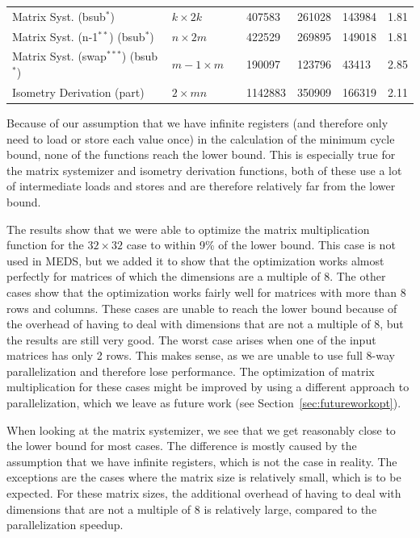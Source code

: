 \documentclass[11pt,a4paper]{report}
\theoremstyle{definition}
\begin{document}
\begin{table}
{\begin{tabular}{lllR{1.35cm}R{1.2cm}R{1.2cm}r}
      Matrix Syst. (bsub$^{*}$) & $k \times 2k$& & 407583 & 261028 & 143984 & 1.81\\
      Matrix Syst. (n-1$^{**}$) (bsub$^{*}$) & $n \times 2m$& & 422529 & 269895 & 149018 & 1.81\\
      Matrix Syst. (swap$^{***}$) (bsub$^{*}$) & $m-1 \times m$& & 190097 & 123796 & 43413 & 2.85\\
  \midrule
      Isometry Derivation (part) & $2 \times mn$ & & 1142883 & 350909 & 166319 & 2.11\\
      \bottomrule
    \end{tabular}
  }
  \label{tab:lowleveloptimizationresults}
\end{table}

Because of our assumption that we have infinite registers (and therefore only need to load or store each value once) in the calculation of the minimum cycle bound, none of the functions reach the lower bound. This is especially true for the matrix systemizer and isometry derivation functions, both of these use a lot of intermediate loads and stores and are therefore relatively far from the lower bound.

The results show that we were able to optimize the matrix multiplication function for the $32 \times 32$ case to within 9\% of the lower bound. This case is not used in MEDS, but we added it to show that the optimization works almost perfectly for matrices of which the dimensions are a multiple of 8. The other cases show that the optimization works fairly well for matrices with more than 8 rows and columns. These cases are unable to reach the lower bound because of the overhead of having to deal with dimensions that are not a multiple of 8, but the results are still very good. The worst case arises when one of the input matrices has only 2 rows. This makes sense, as we are unable to use full 8-way parallelization and therefore lose performance. The optimization of matrix multiplication for these cases might be improved by using a different approach to parallelization, which we leave as future work (see Section~\ref{sec:futureworkopt}).

When looking at the matrix systemizer, we see that we get reasonably close to the lower bound for most cases. The difference is mostly caused by the assumption that we have infinite registers, which is not the case in reality. The exceptions are the cases where the matrix size is relatively small, which is to be expected. For these matrix sizes, the additional overhead of having to deal with dimensions that are not a multiple of 8 is relatively large, compared to the parallelization speedup.
\end{document}
